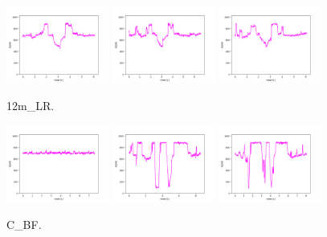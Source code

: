 \begin{figure}[!ht]
\begin{center}
\includegraphics[width=0.3\textwidth]{../data/12m_LR/12m_LR_1.png}
\includegraphics[width=0.3\textwidth]{../data/12m_LR/12m_LR_2.png}
\includegraphics[width=0.3\textwidth]{../data/12m_LR/12m_LR_3.png}
\caption{12m\_LR.\label{fig:12m_LR}}
\end{center}
\end{figure}

\begin{figure}[!ht]
\begin{center}
\includegraphics[width=0.3\textwidth]{../data/C_BF/C_BF_1.png}
\includegraphics[width=0.3\textwidth]{../data/C_BF/C_BF_2.png}
\includegraphics[width=0.3\textwidth]{../data/C_BF/C_BF_3.png}
\caption{C\_BF.\label{fig:C_BF}}
\end{center}
\end{figure}


